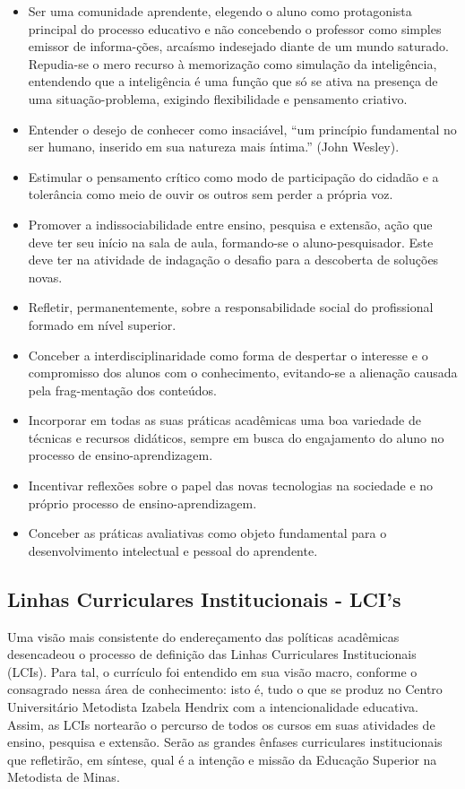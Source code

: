 \documentclass[a4paper, 12pt, openright, oneside, german, french, english, brazil]{abntex2}
\begin{document}
\begin{itemize}
\item Ser uma comunidade aprendente, elegendo o aluno como protagonista principal do processo educativo e não concebendo o professor como simples emissor de informa-ções, arcaísmo indesejado diante de um mundo saturado. Repudia-se o mero recurso à memorização como simulação da inteligência, entendendo que a inteligência é uma função que só se ativa na presença de uma situação-problema, exigindo flexibilidade e pensamento criativo.
\item Entender o desejo de conhecer como insaciável, ``um princípio fundamental no ser humano, inserido em sua natureza mais íntima.'' (John Wesley). 
\item Estimular o pensamento crítico como modo de participação do cidadão e a tolerância como meio de ouvir os outros sem perder a própria voz.
\item Promover a indissociabilidade entre ensino, pesquisa e extensão, ação que deve ter seu início na sala de aula, formando-se o aluno-pesquisador. Este deve ter na atividade de indagação o desafio para a descoberta de soluções novas.
\item Refletir, permanentemente, sobre a responsabilidade social do profissional formado em nível superior.
\item Conceber a interdisciplinaridade como forma de despertar o interesse e o compromisso dos alunos com o conhecimento, evitando-se a alienação causada pela frag-mentação dos conteúdos.
\item Incorporar em todas as suas práticas acadêmicas uma boa variedade de técnicas e recursos didáticos, sempre em busca do engajamento do aluno no processo de ensino-aprendizagem.
\item Incentivar reflexões sobre o papel das novas tecnologias na sociedade e no próprio processo de ensino-aprendizagem.
\item Conceber as práticas avaliativas como objeto fundamental para o desenvolvimento intelectual e pessoal do aprendente.
\end{itemize}

\subsection{Linhas Curriculares Institucionais - LCI's}

Uma visão mais consistente do endereçamento das políticas acadêmicas desencadeou o processo de definição das Linhas Curriculares Institucionais (LCIs). Para tal, o currículo foi entendido em sua visão macro, conforme o consagrado nessa área de conhecimento: isto é, tudo o que se produz no Centro Universitário Metodista Izabela Hendrix com a intencionalidade educativa. Assim, as LCIs nortearão o percurso de todos os cursos em suas atividades de ensino, pesquisa e extensão. Serão as grandes ênfases curriculares institucionais que refletirão, em síntese, qual é a intenção e missão da Educação Superior na Metodista de Minas.
\end{document}
